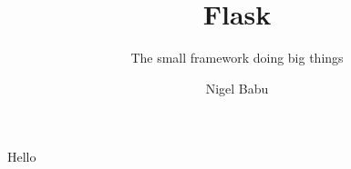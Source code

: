\documentclass[xcolor=dvipsnames]{beamer}
\title{Flask}
\subtitle[Errors]{The small framework doing big things}
\author[nigelb]{Nigel Babu}
\date
\begin{document}
\begin{frame}
    \titlepage
\end{frame}


\begin{frame}
Hello
\end{frame}
\end{document}
